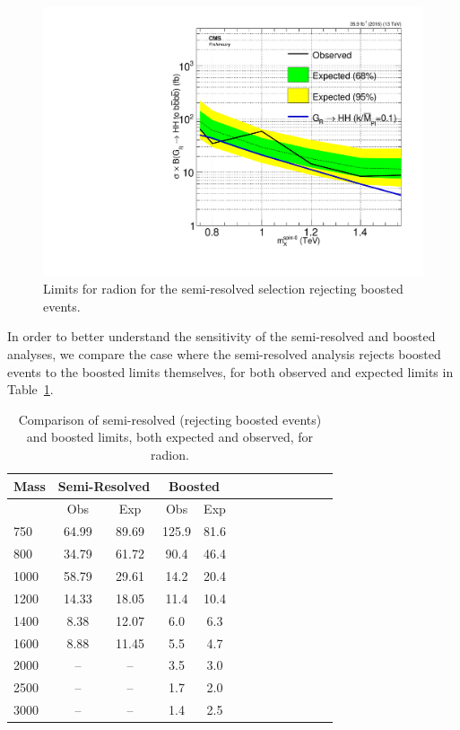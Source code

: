 \begin{figure}[thb!]
\begin{center}
\includegraphics[scale=0.5]{F5/brazilianFlag_Rad_2p1boost_HH4b2p1_HH4b2p1_13TeV.pdf}
\end{center}
\caption{Limits for radion for the semi-resolved selection rejecting boosted events.}
\label{fig:radblindboost}
\end{figure} 

In order to better understand the sensitivity of the semi-resolved and boosted analyses, we compare the case where the semi-resolved analysis rejects boosted events to the boosted limits themselves, for both observed and expected limits in Table~\ref{tab:boostcompareRad}. 

\begin{table}[h]
\begin{center}
\begin{tabular}{|l|c|c|c|c|c|c|c|c|c|c|c|c|}
\hline
Mass & \multicolumn{2}{|c|}{Semi-Resolved} & \multicolumn{2}{|c|}{Boosted}\\ \hline
& Obs & Exp & Obs & Exp\\ \hline
750 & 64.99 & 89.69 & 125.9 & 81.6 \\
800 & 34.79 & 61.72 & 90.4 & 46.4 \\
1000 & 58.79 & 29.61 & 14.2 & 20.4 \\
1200 & 14.33 & 18.05 & 11.4 & 10.4 \\
1400 & 8.38 & 12.07 & 6.0 & 6.3 \\
1600 & 8.88 & 11.45 & 5.5 & 4.7 \\
2000 & -- & -- & 3.5 & 3.0\\
2500 & -- & -- & 1.7 & 2.0\\
3000 & -- & -- & 1.4 & 2.5 \\
\hline
\end{tabular}
\end{center}
\caption{Comparison of semi-resolved (rejecting boosted events) and boosted limits, both expected and observed, for radion.}
\label{tab:boostcompareRad}
\end{table}

